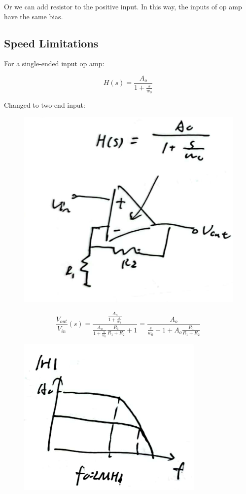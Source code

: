 \documentclass[fontset=windows]{article}
\begin{document}
Or we can add resistor to the positive input. In this way, the inputs of op amp have the same bias. 

\subsection*{Speed Limitations}

For a single-ended input op amp: 

$$H(s)=\frac{A_o}{1+\frac{s}{w_0}}$$

Changed to two-end input: 

\begin{figure}[htbp]
    \centering
    \includegraphics[scale=0.6]{18.jpg}
    \captionsetup{labelformat=empty}
    \caption{}
    \label{18}
\end{figure}

$$\frac{V_{out}}{V_{in}}(s)=\frac{\frac{A_o}{1+\frac{s}{w_0}}}{\frac{A_o}{1+\frac{s}{w_0}}\frac{R_1}{R_1+R_2}+1}=\frac{A_o}{\frac{s}{w_0}+1+A_o\frac{R_1}{R_1+R_2}}$$

\begin{figure}[htbp]
    \centering
    \includegraphics[scale=0.6]{17.jpg}
    \captionsetup{labelformat=empty}
    \caption{}
    \label{17}
\end{figure}
\end{document}
